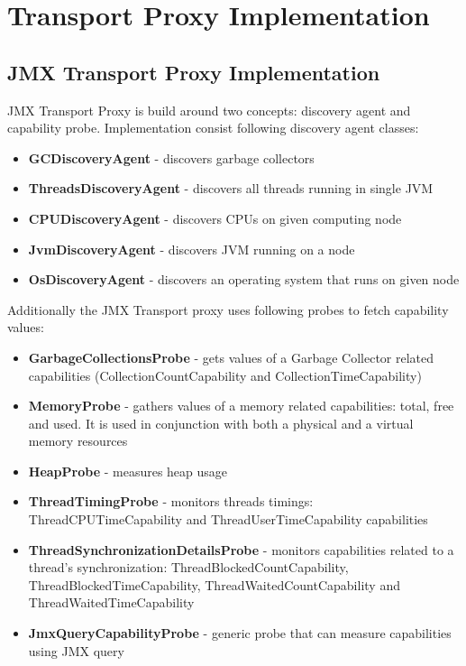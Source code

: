 \section{Transport Proxy Implementation}

\subsection{JMX Transport Proxy Implementation}

JMX Transport Proxy is build around two concepts: discovery agent and capability probe. Implementation consist following discovery agent classes:

\begin{itemize} 
  \item{\bf{GCDiscoveryAgent}} - discovers garbage collectors 
  \item{\bf{ThreadsDiscoveryAgent}} - discovers all threads running in single JVM
  \item{\bf{CPUDiscoveryAgent}} - discovers CPUs on given computing node
  \item{\bf{JvmDiscoveryAgent}} - discovers JVM running on a node
  \item{\bf{OsDiscoveryAgent}} - discovers an operating system that runs on given node
\end{itemize} 

Additionally the JMX Transport proxy uses following probes to fetch capability values: 

\begin{itemize} 
  \item{\bf{GarbageCollectionsProbe}} - gets values of a Garbage Collector related capabilities (CollectionCountCapability and CollectionTimeCapability)
  \item{\bf{MemoryProbe}} - gathers values of a memory related capabilities: total, free and used. It is used in conjunction with both a physical and a virtual memory resources
  \item{\bf{HeapProbe}} - measures heap usage  
  \item{\bf{ThreadTimingProbe}} - monitors threads timings: ThreadCPUTimeCapability and ThreadUserTimeCapability capabilities
  \item{\bf{ThreadSynchronizationDetailsProbe}} - monitors capabilities related to a thread\rq{}s synchronization: ThreadBlockedCountCapability, ThreadBlockedTimeCapability, ThreadWaitedCountCapability and ThreadWaitedTimeCapability
  \item{\bf{JmxQueryCapabilityProbe}} - generic probe that can measure capabilities using JMX query
\end{itemize} 

